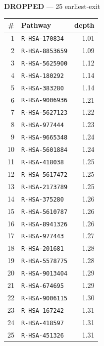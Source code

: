 \documentclass[10pt]{article}
\begin{document}
\begin{minipage}[t]{0.48\textwidth}\centering\textbf{\color{red!60!black}DROPPED} --- 25 earliest-exit\\[3pt]
\begin{tabular}{@{}r l r@{}}
\toprule
\# & Pathway & depth \\
\midrule
1 & \texttt{R-HSA-170834} & 1.01 \\
2 & \texttt{R-HSA-8853659} & 1.09 \\
3 & \texttt{R-HSA-5625900} & 1.12 \\
4 & \texttt{R-HSA-180292} & 1.14 \\
5 & \texttt{R-HSA-383280} & 1.14 \\
6 & \texttt{R-HSA-9006936} & 1.21 \\
7 & \texttt{R-HSA-5627123} & 1.22 \\
8 & \texttt{R-HSA-977444} & 1.23 \\
9 & \texttt{R-HSA-9665348} & 1.24 \\
10 & \texttt{R-HSA-5601884} & 1.24 \\
11 & \texttt{R-HSA-418038} & 1.25 \\
12 & \texttt{R-HSA-5617472} & 1.25 \\
13 & \texttt{R-HSA-2173789} & 1.25 \\
14 & \texttt{R-HSA-375280} & 1.26 \\
15 & \texttt{R-HSA-5610787} & 1.26 \\
16 & \texttt{R-HSA-8941326} & 1.26 \\
17 & \texttt{R-HSA-977443} & 1.27 \\
18 & \texttt{R-HSA-201681} & 1.28 \\
19 & \texttt{R-HSA-5578775} & 1.28 \\
20 & \texttt{R-HSA-9013404} & 1.29 \\
21 & \texttt{R-HSA-674695} & 1.29 \\
22 & \texttt{R-HSA-9006115} & 1.30 \\
23 & \texttt{R-HSA-167242} & 1.31 \\
24 & \texttt{R-HSA-418597} & 1.31 \\
25 & \texttt{R-HSA-451326} & 1.31 \\
\bottomrule
\end{tabular}
\end{minipage}
\end{document}
